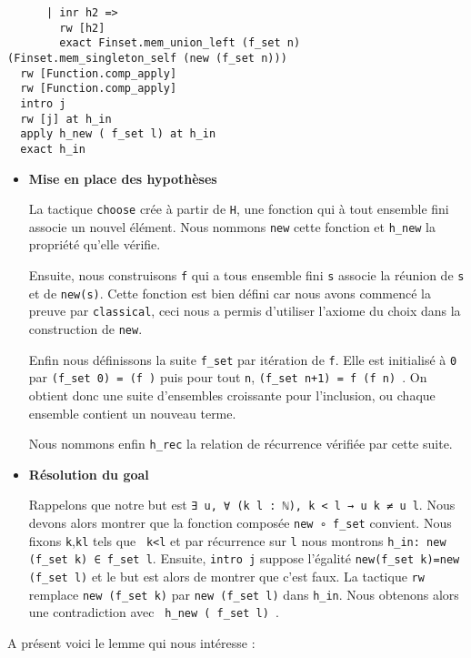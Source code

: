 \documentclass[a4paper, 12pt]{article}
\newcommand{\lean}[1]{\texttt{#1}}
\begin{document}
\begin{itemize}
\begin{verbatim}
      | inr h2 =>
        rw [h2]
        exact Finset.mem_union_left (f_set n) (Finset.mem_singleton_self (new (f_set n)))
  rw [Function.comp_apply]
  rw [Function.comp_apply]
  intro j
  rw [j] at h_in
  apply h_new ( f_set l) at h_in
  exact h_in
\end{verbatim}


\begin{itemize}

    \item \textbf{Mise en place des hypothèses}

    La tactique \lean{choose} crée à partir de \lean{H}, une fonction qui à tout ensemble fini associe un nouvel élément. Nous nommons \lean{new} cette fonction et \lean{h_new} la propriété qu'elle vérifie.

    Ensuite, nous construisons \lean{f} qui a tous ensemble fini \lean{s} associe la réunion de \lean{s} et de \lean{{new(s)}}. Cette fonction est bien défini car nous avons commencé la preuve par \lean{classical}, ceci nous a permis d'utiliser l'axiome du choix dans la construction de \lean{new}.

    Enfin nous définissons la suite \lean{f_set} par itération de \lean{f}. Elle est initialisé à \lean{0} par \lean{(f_set 0) = (f \empty)} puis pour tout \lean{n}, \lean{(f_set n+1) = f (f n) }. On obtient donc une suite d'ensembles croissante pour l'inclusion, ou chaque ensemble contient un nouveau terme.

    Nous nommons enfin \lean{h_rec} la relation de récurrence vérifiée par cette suite.

    \item \textbf{Résolution du goal }
    
    Rappelons que notre but est \lean{∃ u, ∀ (k l : ℕ), k < l → u k ≠ u l}. Nous devons alors montrer que la fonction composée \lean{new ∘ f_set} convient. Nous fixons \lean{k},\lean{kl} tels que \lean{ k<l} et par récurrence sur \lean{l} nous montrons \lean{h_in: new (f_set k) ∈ f_set l}. Ensuite, \lean{intro j} suppose l'égalité \lean{new(f_set k)=new (f_set l)} et le but est alors de montrer que c'est faux. La tactique \lean{rw} remplace \lean{new (f_set k)} par \lean{new (f_set l)} dans \lean{h_in}. Nous obtenons alors une contradiction avec \lean{ h_new ( f_set l) }.
\end{itemize}

A présent voici le lemme qui nous intéresse :


\end{itemize}
\end{document}
